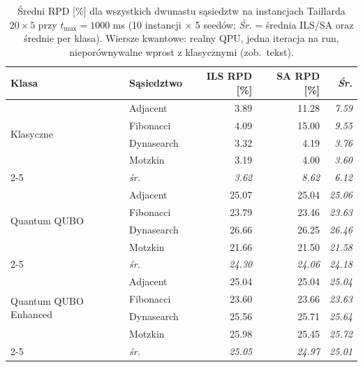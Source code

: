 \documentclass[11pt,a4paper]{article}
\begin{document}
\begin{table}[h]
\centering
\caption{Średni RPD [\%] dla wszystkich dwunastu sąsiedztw na
  instancjach Taillarda $20\times5$ przy $t_{\max}=1000$ ms
  (10 instancji $\times$ 5 seedów; \emph{Śr.} = średnia ILS/SA oraz
  średnie per klasa). Wiersze kwantowe: realny QPU, jedna iteracja na
  run, nieporównywalne wprost z klasycznymi (zob.\ tekst).}
\label{tab:rpd_n20}
\begin{tabular}{@{}llrr@{\quad}r@{}}
\toprule
Klasa & Sąsiedztwo & ILS RPD [\%] & SA RPD [\%] & \emph{Śr.} \\
\midrule
\multirow{4}{*}{Klasyczne}
  & Adjacent    & 3.89 & 11.28 & \emph{7.59} \\
  & Fibonacci   & 4.09 & 15.00 & \emph{9.55} \\
  & Dynasearch  & 3.32 &  4.19 & \emph{3.76} \\
  & Motzkin     & 3.19 &  4.00 & \emph{3.60} \\
\cmidrule(l){2-5}
  & \emph{śr.}  & \emph{3.62} & \emph{8.62} & \emph{6.12} \\
\midrule
\multirow{4}{*}{Quantum QUBO}
  & Adjacent    & 25.07 & 25.04 & \emph{25.06} \\
  & Fibonacci   & 23.79 & 23.46 & \emph{23.63} \\
  & Dynasearch  & 26.66 & 26.25 & \emph{26.46} \\
  & Motzkin     & 21.66 & 21.50 & \emph{21.58} \\
\cmidrule(l){2-5}
  & \emph{śr.}  & \emph{24.30} & \emph{24.06} & \emph{24.18} \\
\midrule
\multirow{4}{*}{Quantum QUBO Enhanced}
  & Adjacent    & 25.04 & 25.04 & \emph{25.04} \\
  & Fibonacci   & 23.60 & 23.66 & \emph{23.63} \\
  & Dynasearch  & 25.56 & 25.71 & \emph{25.64} \\
  & Motzkin     & 25.98 & 25.45 & \emph{25.72} \\
\cmidrule(l){2-5}
  & \emph{śr.}  & \emph{25.05} & \emph{24.97} & \emph{25.01} \\
\bottomrule
\end{tabular}
\end{table}
\end{document}
